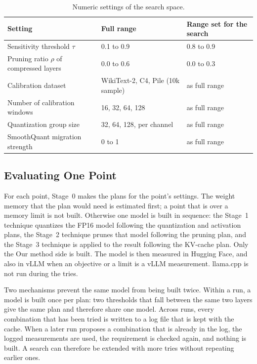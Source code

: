 \documentclass[
11pt, %
english, %
singlespacing, %
headsepline, %
]{MastersDoctoralThesis} %
\begin{document}
\begin{table}[htbp]
\centering
\small
\caption{Numeric settings of the search space.}
\label{tab:ch4-space}
\renewcommand{\arraystretch}{1.2}
\begin{tabularx}{\textwidth}{Xll}
\hline
\textbf{Setting} & \textbf{Full range} & \textbf{Range set for the search} \\
\hline
Sensitivity threshold $\tau$ & 0.1 to 0.9 & 0.8 to 0.9 \\
Pruning ratio $\rho$ of compressed layers & 0.0 to 0.6 & 0.0 to 0.3 \\
Calibration dataset & WikiText-2, C4, Pile (10k sample) & as full range \\
Number of calibration windows & 16, 32, 64, 128 & as full range \\
Quantization group size & 32, 64, 128, per channel & as full range \\
SmoothQuant migration strength & 0 to 1 & as full range \\
\hline
\end{tabularx}
\end{table}

\subsection{Evaluating One Point}
\label{sec:ch4-point}

For each point, Stage~0 makes the plans for the point's settings. The weight memory that the plan would need is estimated first; a point that is over a memory limit is not built. Otherwise one model is built in sequence: the Stage~1 technique quantizes the FP16 model following the quantization and activation plans, the Stage~2 technique prunes that model following the pruning plan, and the Stage~3 technique is applied to the result following the KV-cache plan. Only the Our method side is built. The model is then measured in Hugging Face, and also in vLLM when an objective or a limit is a vLLM measurement. llama.cpp is not run during the tries.

Two mechanisms prevent the same model from being built twice. Within a run, a model is built once per plan: two thresholds that fall between the same two layers give the same plan and therefore share one model. Across runs, every combination that has been tried is written to a log file that is kept with the cache. When a later run proposes a combination that is already in the log, the logged measurements are used, the requirement is checked again, and nothing is built. A search can therefore be extended with more tries without repeating earlier ones.
\end{document}

